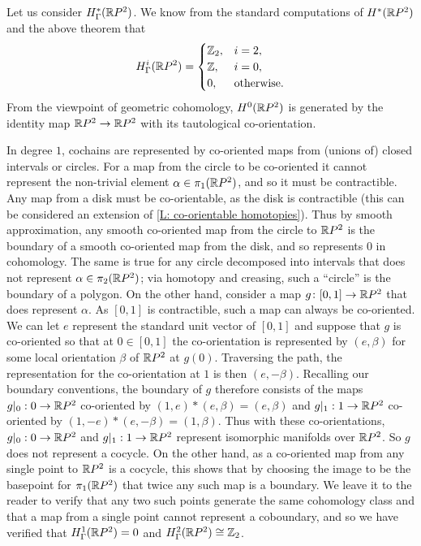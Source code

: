 \begin{example}
	Let us consider $H^*_\Gamma(\mathbb{R} P^2)$.
	We know from the standard computations of $H^*(\mathbb{R} P^2)$ and the above theorem that
	\begin{equation*}
		H_\Gamma^i(\mathbb{R} P^2) =
		\begin{cases}
			\mathbb{Z}_2,&i = 2,\\
			\mathbb{Z},&i = 0,\\
			0,&\text{otherwise.}
		\end{cases}
	\end{equation*}
	From the viewpoint of geometric cohomology, $H^0(\mathbb{R} P^2)$ is generated by the identity map $\mathbb{R} P^2 \to \mathbb{R} P^2$ with its tautological co-orientation.

	In degree $1$, cochains are represented by co-oriented maps from (unions of) closed intervals or circles.
	For a map from the circle to be co-oriented it cannot represent the non-trivial element $\alpha \in \pi_1(\mathbb{R} P^2)$, and so it must be contractible.
	Any map from a disk must be co-orientable, as the disk is contractible (this can be considered an extension of \cref{L: co-orientable homotopies}).
	Thus by smooth approximation, any smooth co-oriented map from the circle to $\mathbb{R} P^2$ is the boundary of a smooth co-oriented map from the disk, and so represents $0$ in cohomology.
	The same is true for any circle decomposed into intervals that does not represent $\alpha \in \pi_2(\mathbb{R} P^2)$; via homotopy and creasing, such a ``circle'' is the boundary of a polygon.
	On the other hand, consider a map $g \colon [0,1] \to \mathbb{R} P^2$ that does represent $\alpha$.
	As $[0,1]$ is contractible, such a map can always be co-oriented.
	We can let $e$ represent the standard unit vector of $[0,1]$ and suppose that $g$ is co-oriented so that at $0 \in [0,1]$ the co-orientation is represented by $(e,\beta)$ for some local orientation $\beta$ of $\mathbb{R} P^2$ at $g(0)$.
	Traversing the path, the representation for the co-orientation at $1$ is then $(e,-\beta)$.
	Recalling our boundary conventions, the boundary of $g$ therefore consists of the maps $g|_0:0 \to \mathbb{R} P^2$ co-oriented by $(1,e)*(e,\beta) = (e,\beta)$ and $g|_1:1 \to \mathbb{R} P^2$ co-oriented by $(1,-e)*(e,-\beta) = (1,\beta)$.
	Thus with these co-orientations, $g|_0:0 \to \mathbb{R} P^2$ and $g|_1:1 \to \mathbb{R} P^2$ represent isomorphic manifolds over $\mathbb{R} P^2$.
	So $g$ does not represent a cocycle.
	On the other hand, as a co-oriented map from any single point to $\mathbb{R} P^2$ is a cocycle, this shows that by choosing the image to be the basepoint for $\pi_1(\mathbb{R} P^2)$ that twice any such map is a boundary.
	We leave it to the reader to verify that any two such points generate the same cohomology class and that a map from a single point cannot represent a coboundary, and so we have verified that $H^1_\Gamma(\mathbb{R} P^2) = 0$ and $H_\Gamma^2(\mathbb{R} P^2) \cong \mathbb{Z}_2$.
\end{example}

